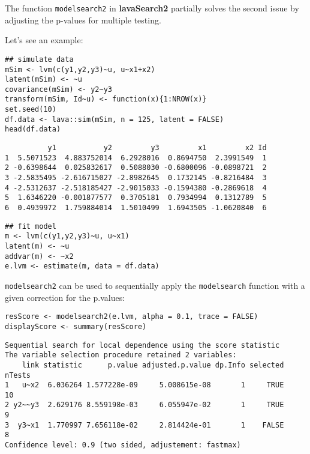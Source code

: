 \documentclass[12pt]{article}
\begin{document}
The function \texttt{modelsearch2} in \textbf{lavaSearch2} partially solves the
second issue by adjusting the p-values for multiple testing.

Let's see an example:
\lstset{language=r,label= ,caption= ,captionpos=b,numbers=none}
\begin{lstlisting}
## simulate data
mSim <- lvm(c(y1,y2,y3)~u, u~x1+x2)
latent(mSim) <- ~u
covariance(mSim) <- y2~y3
transform(mSim, Id~u) <- function(x){1:NROW(x)}
set.seed(10)
df.data <- lava::sim(mSim, n = 125, latent = FALSE)
head(df.data)
\end{lstlisting}

\begin{verbatim}
          y1           y2         y3         x1         x2 Id
1  5.5071523  4.883752014  6.2928016  0.8694750  2.3991549  1
2 -0.6398644  0.025832617  0.5088030 -0.6800096 -0.0898721  2
3 -2.5835495 -2.616715027 -2.8982645  0.1732145 -0.8216484  3
4 -2.5312637 -2.518185427 -2.9015033 -0.1594380 -0.2869618  4
5  1.6346220 -0.001877577  0.3705181  0.7934994  0.1312789  5
6  0.4939972  1.759884014  1.5010499  1.6943505 -1.0620840  6
\end{verbatim}

\lstset{language=r,label= ,caption= ,captionpos=b,numbers=none}
\begin{lstlisting}
## fit model
m <- lvm(c(y1,y2,y3)~u, u~x1)
latent(m) <- ~u
addvar(m) <- ~x2 
e.lvm <- estimate(m, data = df.data)
\end{lstlisting}

\texttt{modelsearch2} can be used to sequentially apply the \texttt{modelsearch}
function with a given correction for the p.values:
\lstset{language=r,label= ,caption= ,captionpos=b,numbers=none}
\begin{lstlisting}
resScore <- modelsearch2(e.lvm, alpha = 0.1, trace = FALSE)
displayScore <- summary(resScore)
\end{lstlisting}

\begin{verbatim}
Sequential search for local dependence using the score statistic 
The variable selection procedure retained 2 variables:
    link statistic      p.value adjusted.p.value dp.Info selected nTests
1   u~x2  6.036264 1.577228e-09     5.008615e-08       1     TRUE     10
2 y2~~y3  2.629176 8.559198e-03     6.055947e-02       1     TRUE      9
3  y3~x1  1.770997 7.656118e-02     2.814424e-01       1    FALSE      8
Confidence level: 0.9 (two sided, adjustement: fastmax)
\end{verbatim}
\end{document}
